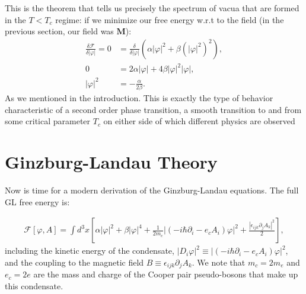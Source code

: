 \documentclass[10pt,twoside]{report}
\numberwithin{equation}{chapter}
\begin{document}
This is the theorem that tells us precisely the spectrum of vacua that are formed in the $T<T_{c}$ regime: if we minimize our free energy w.r.t to the field (in the previous section, our field was $\bm{M}$):
\begin{align}
  \frac{\delta \mathcal{F}}{\delta|\varphi|} = 0 &= \frac{\delta}{\delta|\varphi|} \left( \alpha|\varphi|^{2} + \beta\left( |\varphi|^{2} \right)^{2} \right), \nonumber\\
  0 &= 2\alpha|\varphi| + 4\beta|\varphi|^{2}|\varphi|, \nonumber\\
  |\varphi|^{2} &= -\frac{\alpha}{2\beta}.
\end{align}
As we mentioned in the introduction.  This is exactly the type of behavior characteristic of a second order phase transition, a smooth transition to and from some critical parameter $T_{c}$ on either side of which different physics are observed



\chapter{Ginzburg-Landau Theory}

Now is time for a modern derivation of the Ginzburg-Landau equations.  The full GL free energy is:

\begin{align}
  \mathcal{F}[\varphi, A] = \int d^{3}x \left[ \alpha|\varphi|^{2}+\beta|\varphi|^{4} + \frac{1}{2m_{c}}\big|\left( -i \hbar \partial_{i} - e_{c}A_{i} \right)\varphi\big|^{2} + \frac{|\epsilon_{ijk}\partial_{j}A_{k}|^{2}}{2} \right],
\end{align}
including the kinetic energy of the condensate, $|D_{i}\varphi|^{2} \equiv \big|\left( -i \hbar \partial_{i} - e_{c}A_{i} \right)\varphi\big|^{2}$, and the coupling to the magnetic field $B \equiv \epsilon_{ijk}\partial_{j}A_{k}$.  We note that $m_{c}=2m_{e}$ and $e_{c}=2e$ are the mass and charge of the Cooper pair pseudo-bosons that make up this condensate.
\end{document}
